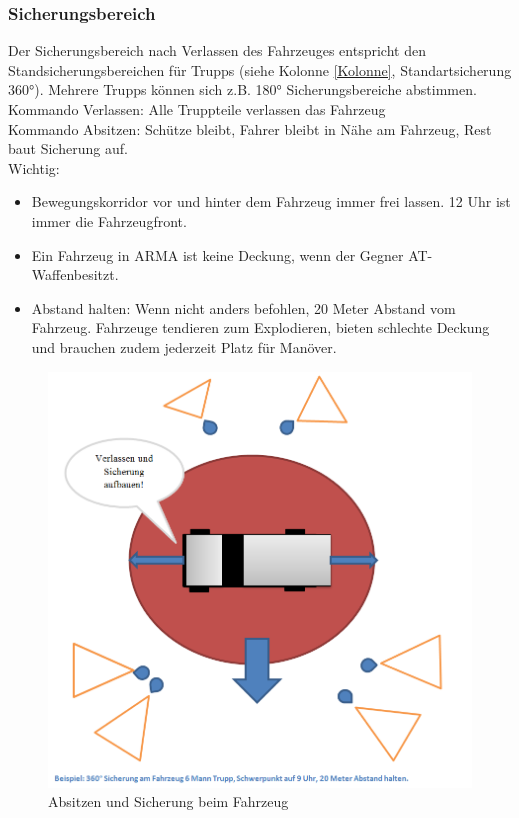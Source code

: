 \subsubsection{Sicherungsbereich}
	Der Sicherungsbereich nach Verlassen des Fahrzeuges entspricht den Standsicherungsbereichen für  Trupps (siehe Kolonne \autoref{Kolonne}, Standartsicherung 360°). Mehrere Trupps können sich z.B. 180° Sicherungsbereiche abstimmen. \\
	Kommando Verlassen:  Alle Truppteile verlassen das Fahrzeug \\
	Kommando Absitzen: Schütze bleibt, Fahrer bleibt in Nähe am Fahrzeug, Rest baut Sicherung auf.  \\
	Wichtig:
		\begin{itemize}
			\item Bewegungskorridor vor und hinter dem Fahrzeug immer frei lassen. 12 Uhr ist immer die Fahrzeugfront.
			\item Ein Fahrzeug in ARMA ist keine Deckung, wenn der Gegner AT-Waffenbesitzt.
			\item Abstand halten:  Wenn nicht anders befohlen, 20 Meter Abstand vom Fahrzeug. Fahrzeuge tendieren zum Explodieren, bieten schlechte Deckung  und brauchen zudem jederzeit Platz für Manöver.
		\end{itemize}

		\begin{figure}[htbp]
			\centering
			\includegraphics[width=15cm]{./Grafiken/Abschnitt/Fahrzeug_verlassen.png}
			\caption{Absitzen und Sicherung beim Fahrzeug}
		\end{figure}
